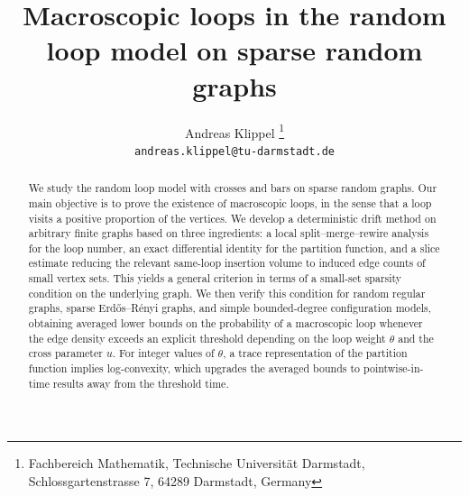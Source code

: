 \documentclass[11pt]{article}
\title{Macroscopic loops in the random loop model on sparse random graphs}
\author{
Andreas Klippel
\thanks{Fachbereich Mathematik, Technische Universit\"at Darmstadt, Schlossgartenstrasse 7, 64289 Darmstadt, Germany}
\\
\texttt{andreas.klippel@tu-darmstadt.de}
}
\theoremstyle{remark}
\theoremstyle{plain}
\newcommand{\1}{\mathbbm{1}}
\begin{document}
\maketitle

\begin{abstract}
We study the random loop model with crosses and bars on sparse random graphs. Our main objective is to prove the existence of macroscopic loops, in the sense that a loop visits a positive proportion of the vertices. We develop a deterministic drift method on arbitrary finite graphs based on three ingredients: a local split--merge--rewire analysis for the loop number, an exact differential identity for the partition function, and a slice estimate reducing the relevant same-loop insertion volume to induced edge counts of small vertex sets. This yields a general criterion in terms of a small-set sparsity condition on the underlying graph. We then verify this condition for random regular graphs, sparse Erd\H{o}s--R\'enyi graphs, and simple bounded-degree configuration models, obtaining averaged lower bounds on the probability of a macroscopic loop whenever the edge density exceeds an explicit threshold depending on the loop weight \(\theta\) and the cross parameter \(u\). For integer values of \(\theta\), a trace representation of the partition function implies log-convexity, which upgrades the averaged bounds to pointwise-in-time results away from the threshold time.
\end{abstract}
\end{document}
